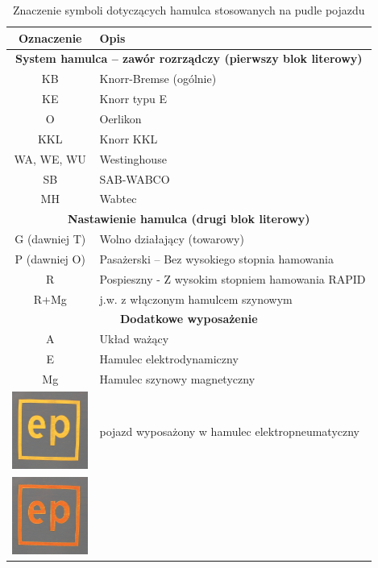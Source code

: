 \begin{table}
	\caption{Znaczenie symboli dotyczących hamulca stosowanych na pudle pojazdu}
	\label{tab:hamulec}
\begin{tabular}{|c|m{12cm}|}
	\hline 
	Oznaczenie&Opis\\ 
	\hline
	\multicolumn{2}{|c|}{\textbf{System hamulca – zawór rozrządczy (pierwszy blok literowy)}} \\
	\hline
	KB & Knorr-Bremse (ogólnie)\\
	\hline
	KE & Knorr typu E\\
	\hline
	O & Oerlikon\\
	\hline
	KKL & Knorr KKL\\
	\hline
	WA, WE, WU & Westinghouse \\
	\hline
	SB & SAB-WABCO\\
	\hline
	MH & Wabtec\\
	\hline
	\multicolumn{2}{|c|}{\textbf{Nastawienie hamulca (drugi blok literowy)}}\\
	\hline
	G (dawniej T) & Wolno działający (towarowy)\\
	\hline
	P (dawniej O) & Pasażerski – Bez wysokiego stopnia hamowania\\
	\hline
	R & Pospieszny - Z wysokim stopniem hamowania RAPID\\
	\hline
	R+Mg & j.w. z włączonym hamulcem szynowym\\
	\hline
	\multicolumn{2}{|c|}{\textbf{Dodatkowe wyposażenie}}\\
	\hline
	A & Układ ważący\\\hline
	E & Hamulec elektrodynamiczny\\
	\hline
	Mg & Hamulec szynowy magnetyczny\\
	\hline
	\includegraphics[width=2.5cm]{skryptkierownik-img/skryptkierownik-img028.jpg}
	& pojazd wyposażony w hamulec elektropneumatyczny\\
	\hline
	\includegraphics[width=2.5cm]{skryptkierownik-img/skryptkierownik-img029.jpg}

\end{tabular}
\end{table}
